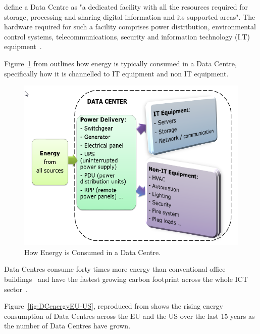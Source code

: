 \documentclass[12pt]{scrartcl}
\begin{document}
\citet{edsdoj.99f37e7899fb4fcaabdaa81e395626c420180101} define a Data Centre as "a dedicated facility with all the resources required for storage, processing and sharing digital information and its supported areas".  The hardware required for such a facility comprises power distribution, environmental control systems, telecommunications, security and information technology (I.T) equipment~\citep{edsdoj.99f37e7899fb4fcaabdaa81e395626c420180101}. 

Figure~\ref{fig:DCenergy} from \citep{edsdoj.99f37e7899fb4fcaabdaa81e395626c420180101} outlines how energy is typically consumed in a Data Centre, specifically how it is channelled to IT equipment and non IT equipment.

\begin{figure}[h]
  \caption{How Energy is Consumed in a Data Centre.}
  \label{fig:DCenergy}
  \centering
    \includegraphics[scale=0.35]{Data_center_energy}
\end{figure}


Data Centres consume forty times more energy than conventional office buildings~\citep{edsdoj.99f37e7899fb4fcaabdaa81e395626c420180101} and have the fastest growing carbon footprint across the whole ICT sector~\citep{edsbas.13818AC20170101}.

Figure~\ref{fig:DCenergyEU-US}, reproduced from \citet{edsbas.13818AC20170101} shows the rising energy consumption of Data Centres across the EU and the US over the last 15 years as the number of Data Centres have grown.
\end{document}

